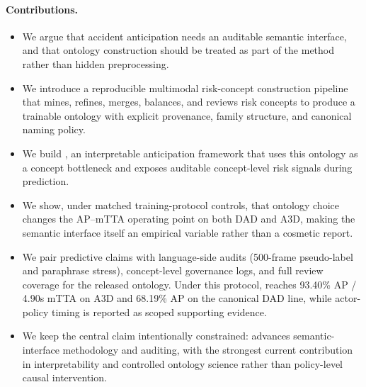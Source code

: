 \paragraph{Contributions.}
\begin{itemize}[leftmargin=1.4em,topsep=2pt,itemsep=1pt]
  \item We argue that accident anticipation needs an auditable semantic interface, and that ontology construction should be treated as part of the method rather than hidden preprocessing.
  \item We introduce a reproducible multimodal risk-concept construction pipeline that mines, refines, merges, balances, and reviews risk concepts to produce a trainable ontology with explicit provenance, family structure, and canonical naming policy.
  \item We build \method{}, an interpretable anticipation framework that uses this ontology as a concept bottleneck and exposes auditable concept-level risk signals during prediction.
  \item We show, under matched training-protocol controls, that ontology choice changes the AP--mTTA operating point on both DAD and A3D, making the semantic interface itself an empirical variable rather than a cosmetic report.
  \item We pair predictive claims with language-side audits (500-frame pseudo-label and paraphrase stress), concept-level governance logs, and full review coverage for the released ontology. Under this protocol, \method{} reaches 93.40\% AP / 4.90s mTTA on A3D and 68.19\% AP on the canonical DAD line, while actor-policy timing is reported as scoped supporting evidence.
  \item We keep the central claim intentionally constrained: \method{} advances semantic-interface methodology and auditing, with the strongest current contribution in interpretability and controlled ontology science rather than policy-level causal intervention.
\end{itemize}
